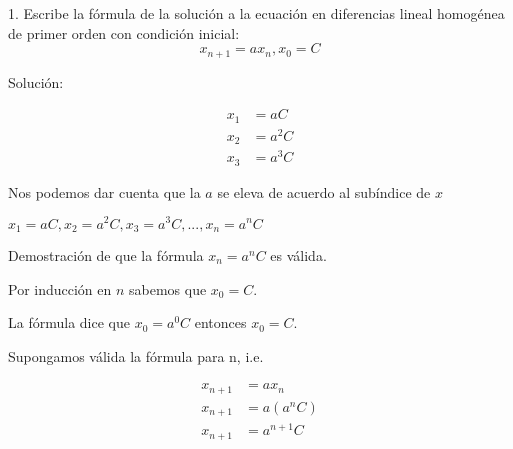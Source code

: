 \documentclass{article}
\begin{document}
1. Escribe la fórmula de la solución a la ecuación en diferencias lineal homogénea de primer orden con condición inicial:$$x_{n+1}=ax_n, x_0=C$$

Solución:

\begin{align*}
  x_1&=aC\\
  x_2&=a^2C\\
  x_3&=a^3C
\end{align*}

Nos podemos dar cuenta que la $a$ se eleva de acuerdo al subíndice de $x$

$x_{1}=aC, x_{2}=a^{2}C, x_{3}=a^{3}C, ..., x_{n}=a^{n}C$

Demostración de que  la fórmula $x_n=a^nC$ es válida.

Por inducción en $n$ sabemos que $x_0=C.$

La fórmula dice que $x_0=a^0C$ entonces $x_0=C.$


Supongamos válida la fórmula para n, i.e.

\begin{align*}
  x_{n+1}&=ax_n\\
  x_{n+1}&=a(a^nC)\\
  x_{n+1}&=a^{n+1}C
\end{align*}
\end{document}
